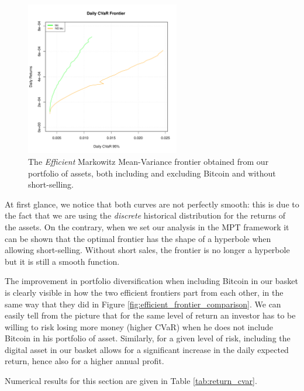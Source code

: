 \begin{figure}
	\centering
	\includegraphics[width=0.6\textwidth]{Images/efficient_frontier_CVaR.pdf}
	\caption{The \textit{Efficient} Markowitz Mean-Variance frontier obtained from our portfolio of assets, both including and excluding Bitcoin and without short-selling.}
	\label{fig:cvar_efficient_frontier_comparison}
\end{figure}


At first glance, we notice that both curves are not perfectly smooth: this is due to the fact that we are using the \textit{discrete} historical distribution for the returns of the assets. On the contrary, when we set our analysis in the MPT framework it can be shown that the optimal frontier has the shape of a hyperbole when allowing short-selling. Without short sales, the frontier is no longer a hyperbole but it is still a smooth function.

The improvement in portfolio diversification when including Bitcoin in our basket is clearly visible in how the two efficient frontiers part from each other, in the same way that they did in Figure \ref{fig:efficient_frontier_comparison}.
We can easily tell from the picture that for the same level of return an investor has to be willing to risk losing more money (higher CVaR) when he does not include Bitcoin in his portfolio of asset.
Similarly, for a given level of risk, including the digital asset in our basket allows for a significant increase in the daily expected return,  hence also for a higher annual profit.

Numerical results for this section are given in Table \ref{tab:return_cvar}.


